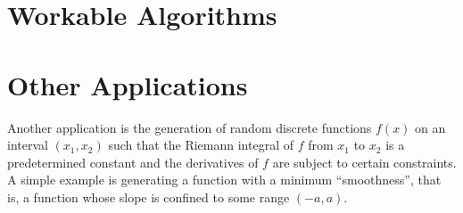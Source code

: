 \documentclass[12pt]{article}
\begin{document}
\section*{Workable Algorithms}

\section*{Other Applications}
Another application is the generation of random discrete functions $f(x)$ on an interval $(x_1, x_2)$ such that the Riemann integral of $f$ from $x_1$ to $x_2$ is a predetermined constant and the derivatives of $f$ are subject to certain constraints. A simple example is generating a function with a minimum ``smoothness'', that is, a function whose slope is confined to some range $(-a, a)$.
\end{document}
